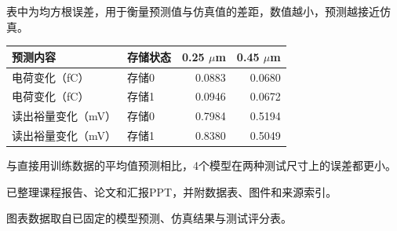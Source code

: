 \documentclass[UTF8,fontset=fandol,10pt,a4paper]{ctexart}
\newcommand{\sect}[1]{\par\vspace{9pt}{\large\bfseries #1}\par\vspace{4pt}}
\newcommand{\note}[1]{\par{\footnotesize\color{muted}#1}\par}
\begin{document}
\sect{测试误差}
\note{表中为均方根误差，用于衡量预测值与仿真值的差距，数值越小，预测越接近仿真。}
\renewcommand{\arraystretch}{1.4}
\begin{tabularx}{\textwidth}{@{}Xlrr@{}}
\toprule
预测内容 & 存储状态 & 0.25 $\mu$m & 0.45 $\mu$m \\
\midrule
电荷变化（fC） & 存储0 & 0.0883 & 0.0680 \\
电荷变化（fC） & 存储1 & 0.0946 & 0.0672 \\
读出裕量变化（mV） & 存储0 & 0.7984 & 0.5194 \\
读出裕量变化（mV） & 存储1 & 0.8380 & 0.5049 \\
\bottomrule
\end{tabularx}\par
\vspace{9pt}
与直接用训练数据的平均值预测相比，4个模型在两种测试尺寸上的误差都更小。

\vfill
\sect{现有材料}
已整理课程报告、论文和汇报PPT，并附数据表、图件和来源索引。
\note{图表数据取自已固定的模型预测、仿真结果与测试评分表。}
\end{document}
